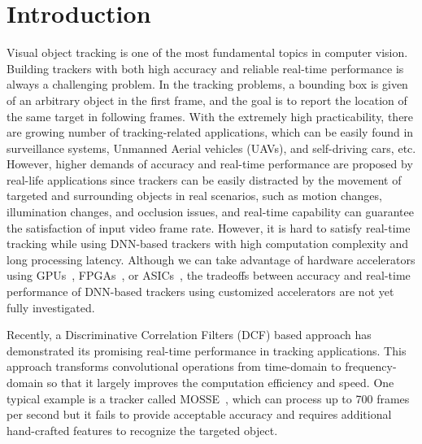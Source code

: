 \documentclass[runningheads]{llncs}
\begin{document}
\section{Introduction}
\label{sec:Introduction}
Visual object tracking is one of the most fundamental topics in computer vision. Building trackers with both high accuracy and reliable real-time performance is always a challenging problem. In the tracking problems, a bounding box is given of an arbitrary object in the first frame, and the goal is to report the location of the same target in following frames. With the extremely high practicability, there are growing number of tracking-related applications, which can be easily found in surveillance systems, Unmanned Aerial vehicles (UAVs), and self-driving cars, etc. However, higher demands of accuracy and real-time performance are proposed by real-life applications since trackers can be easily distracted by the movement of targeted and surrounding objects in real scenarios, such as motion changes, illumination changes, and occlusion issues, and real-time capability can guarantee the satisfaction of input video frame rate. 
However, it is hard to satisfy real-time tracking while using DNN-based trackers with high computation complexity and long processing latency. Although we can take advantage of hardware accelerators using GPUs~\cite{nvdawhitepaper1,zhao2012real,nvdawhitepaper2,li2020edd}, FPGAs~\cite{zhang2017high,zhangdnnbuilder,xu2020autodnnchip,chen2016platform,liu2011real,zhuge2018face,zhang2020skynet,he2009novel}, or ASICs~\cite{isscc_2016_chen_eyeriss,han2016eie,jouppi2017datacenter}, the tradeoffs between accuracy and real-time performance of DNN-based trackers using customized accelerators are not yet fully investigated.

Recently, a Discriminative Correlation Filters (DCF) based approach has demonstrated its promising real-time performance in tracking applications. This approach transforms convolutional operations from time-domain to frequency-domain so that it largely improves the computation efficiency and speed. One typical example is a tracker called MOSSE~\cite{bolme2010visual}, which can process up to 700 frames per second but it fails to provide acceptable accuracy and requires additional hand-crafted features to recognize the targeted object.
\end{document}
